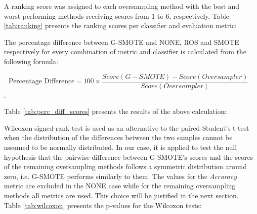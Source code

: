 \documentclass[remotesensing,article,submit,moreauthors,pdftex]{Definitions/mdpi}
\begin{document}
A ranking score was assigned to each oversampling method with the best and worst performing methods receiving scores from 1 to 6, respectively. Table \ref{tab:ranking} presents the ranking scores per classifier and evaluation metric:


The percentage difference between G-SMOTE and NONE, ROS and SMOTE respectively for every combination of metric and classifier is calculated from the following formula: 

$$ \text{Percentage Difference} = 100 \times \frac{Score(G-SMOTE) - Score(Oversampler)}{Score(Oversampler)} $$. 

Table \ref{tab:perc_diff_scores} presents the results of the above calculation:


Wilcoxon signed-rank test is used as an alternative to the paired Student's t-test when the distribution of the differences between the two samples cannot be assumed to be normally distributed. In our case, it is applied to test the null hypothesis that the pairwise difference between G-SMOTE's scores and the scores of the remaining oversampling methods follows a symmetric distribution around zero, i.e. G-SMOTE performs similarly to them. The values for the \textit{Accuracy} metric are excluded in the NONE case while for the remaining oversampling methods all metrics are used. This choice will be justified in the next section. Table \ref{tab:wilcoxon} presents the p-values for the Wilcoxon tests:
\end{document}
